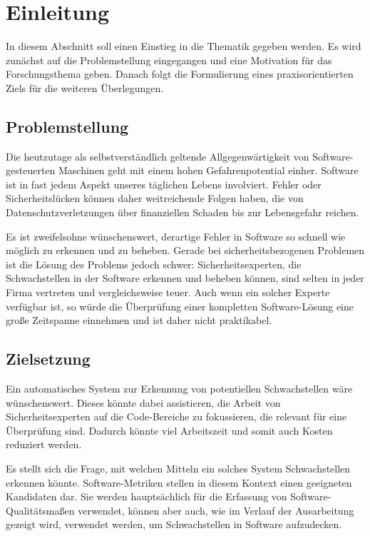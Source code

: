 \section{Einleitung}
\label{sec:einleitung}
In diesem Abschnitt soll einen Einstieg in die Thematik gegeben werden.
Es wird zunächst auf die Problemstellung eingegangen und eine Motivation für das Forschungsthema geben.
Danach folgt die Formulierung eines praxisorientierten Ziels für die weiteren Überlegungen.

\subsection{Problemstellung}
Die heutzutage als selbstverständlich geltende Allgegenwärtigkeit von Software-gesteuerten Maschinen geht mit einem hohen Gefahrenpotential einher.
Software ist in fast jedem Aspekt unseres täglichen Lebens involviert.
Fehler oder Sicherheitslücken können daher weitreichende Folgen haben, die von Datenschutzverletzungen über finanziellen Schaden bis zur Lebensgefahr reichen.

Es ist zweifelsohne wünschenswert, derartige Fehler in Software so schnell wie möglich zu erkennen und zu beheben.
Gerade bei sicherheitsbezogenen Problemen ist die Lösung des Problems jedoch schwer:
Sicherheitsexperten, die Schwachstellen in der Software erkennen und beheben können, sind selten in jeder Firma vertreten und vergleichsweise teuer.
Auch wenn ein solcher Experte verfügbar ist, so würde die Überprüfung einer kompletten Software-Lösung eine große Zeitspanne einnehmen und ist daher nicht praktikabel.

\subsection{Zielsetzung}
Ein automatisches System zur Erkennung von potentiellen Schwachstellen wäre wünschenswert.
Dieses könnte dabei assistieren, die Arbeit von Sicherheitsexperten auf die Code-Bereiche zu fokussieren, die relevant für eine Überprüfung sind.
Dadurch könnte viel Arbeitszeit und somit auch Kosten reduziert werden.

Es stellt sich die Frage, mit welchen Mitteln ein solches System Schwachstellen erkennen könnte.
Software-Metriken stellen in diesem Kontext einen geeigneten Kandidaten dar.
Sie werden hauptsächlich für die Erfassung von Software-Qualitätsmaßen verwendet, können aber auch, wie im Verlauf der Ausarbeitung gezeigt wird, verwendet werden, um Schwachstellen in Software aufzudecken.
